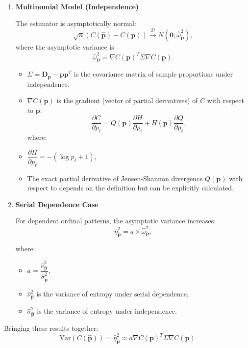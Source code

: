 \begin{enumerate}
	\item \textbf{Multinomial Model (Independence)}

The estimator is asymptotically normal:
$$ \sqrt{n}(C(\widehat{\mathbf{p}})-C(\mathbf{p})) \xrightarrow{\mathscr{D}} N(\mathbf{0}, \widehat{\omega}^2_{\widehat{\mathbf{p}}}),$$
where the asymptotic variance is 
$$\widehat{\omega}^2_{\widehat{\mathbf{p}}}= \nabla C(\mathbf{p})^T \Sigma \nabla C(\mathbf{p}).$$

\begin{itemize}
	\item $\Sigma =\mathbf{D_p}-\mathbf{p}\mathbf{p}^T$ is the covariance matrix of sample proportions under independence. 
	\item $\nabla C(\mathbf{p})$ is the gradient (vector of partial derivatives) of $C$ with respect to $\mathbf{p}:$
	$$\dfrac{\partial C}{\partial p_\ell}=Q(\mathbf{p})\dfrac{\partial H}{\partial p_\ell}+H(\mathbf{p})\dfrac{\partial Q}{\partial p_\ell},$$
	where: 
	
	\item $\dfrac{\partial H}{\partial p_\ell}=-(\log p_\ell +1),$ 
	\item The exact partial derivative of Jensen-Shannon divergence $Q(\mathbf{p})$ with respect to depends on the definition but can be explicitly calculated.
\end{itemize}


	\item \textbf{Serial Dependence Case} 

For dependent ordinal patterns, the asymptotic variance increases: 
$$\widehat{\eta}^2_{\widehat{\mathbf{p}}} = a \times \widehat{\omega}^2_{\widehat{\mathbf{p}}},$$

where:
\begin{itemize}
	\item 
	$a = \dfrac{\widehat{\nu}^2_{\widehat{\mathbf{p}}}}{\widehat{\sigma}^2_{\widehat{\mathbf{p}}}},$ 
	\item  $\widehat{\nu}^2_{\widehat{\mathbf{p}}}$ is the variance of entropy under serial dependence,
	\item $\widehat{\sigma}^2_{\widehat{\mathbf{p}}}$ is the variance of entropy under independence.
\end{itemize}

\end{enumerate}
 Bringing these results together:
\[ \text{Var}(C(\widehat{\mathbf{p}})) = \widehat{\eta}^2_{\widehat{\mathbf{p}}} \approx a \nabla C(\mathbf{{p}})^T \Sigma \nabla C(\mathbf{{p}})
\]

